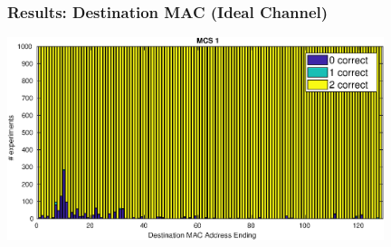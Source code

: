 \documentclass[accentcolor=tud8b,colorbacktitle]{tudbeamer}
\begin{document}
\begin{frame}
\frametitle{Results: Destination MAC (Ideal Channel)}
\begin{centering}
	\includegraphics[width=11cm]{../../gfx/plots/destination}\\
\end{centering}
\end{frame}
\end{document}
